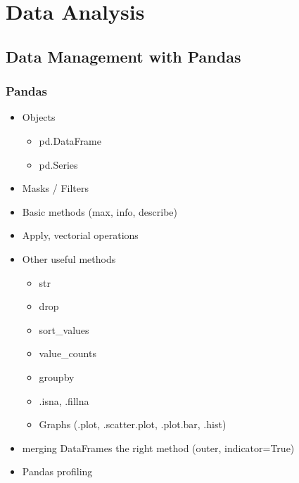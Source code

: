 



\begin{frame}
   \titlepage
\end{frame}



\begin{frame}
   \tableofcontents
\end{frame}

\section{Data Analysis}

\subsection{Data Management with Pandas}

\begin{frame}\frametitle{Pandas}
   \begin{itemize}
      \item Objects
      \begin{itemize}
         \item pd.DataFrame
         \item pd.Series
      \end{itemize}
      \item Masks / Filters
      \item Basic methods (max, info, describe)
      \item Apply, vectorial operations
      \item Other useful methods
      \begin{itemize}
         \item str
         \item drop
         \item sort\_values
         \item value\_counts
         \item groupby
         \item .isna, .fillna
         \item Graphs (.plot, .scatter.plot, .plot.bar, .hist)
      \end{itemize}
      \item merging DataFrames the right method (outer, indicator=True)
      \item Pandas profiling
   \end{itemize}
\end{frame}



